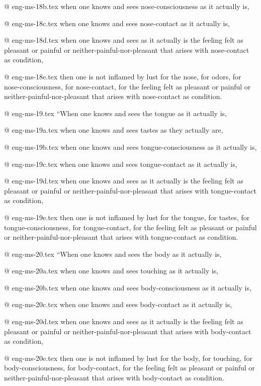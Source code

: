 @ eng-ms-18b.tex
when one knows and sees nose-consciousness as it actually is,

@ eng-ms-18c.tex
when one knows and sees nose-contact as it actually is,

@ eng-ms-18d.tex
when one knows and sees as it actually is the feeling felt as pleasant or painful or neither-painful-nor-pleasant that arises with nose-contact as condition,

@ eng-ms-18e.tex
then one is not inflamed by lust for the nose, for odors, for nose-consciousness, for nose-contact, for the feeling felt as pleasant or painful or neither-painful-nor-pleasant that arises with nose-contact as condition.

@ eng-ms-19.tex
“When one knows and sees the tongue as it actually is,

@ eng-ms-19a.tex
when one knows and sees tastes as they actually are,

@ eng-ms-19b.tex
when one knows and sees tongue-consciousness as it actually is,

@ eng-ms-19c.tex
when one knows and sees tongue-contact as it actually is,

@ eng-ms-19d.tex
when one knows and sees as it actually is the feeling felt as pleasant or painful or neither-painful-nor-pleasant that arises with tongue-contact as condition,

@ eng-ms-19e.tex
then one is not inflamed by lust for the tongue, for tastes, for tongue-consciousness, for tongue-contact, for the feeling felt as pleasant or painful or neither-painful-nor-pleasant that arises with tongue-contact as condition.

@ eng-ms-20.tex
“When one knows and sees the body as it actually is,

@ eng-ms-20a.tex
when one knows and sees touching as it actually is,

@ eng-ms-20b.tex
when one knows and sees body-consciousness as it actually is,

@ eng-ms-20c.tex
when one knows and sees body-contact as it actually is,

@ eng-ms-20d.tex
when one knows and sees as it actually is the feeling felt as pleasant or painful or neither-painful-nor-pleasant that arises with body-contact as condition,

@ eng-ms-20e.tex
then one is not inflamed by lust for the body, for touching, for body-consciousness, for body-contact, for the feeling felt as pleasant or painful or neither-painful-nor-pleasant that arises with body-contact as condition.

